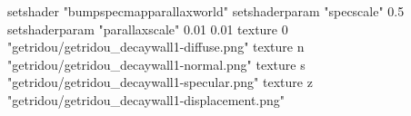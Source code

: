 setshader "bumpspecmapparallaxworld"
setshaderparam "specscale" 0.5
setshaderparam "parallaxscale" 0.01 0.01
texture 0 "getridou/getridou_decaywall1-diffuse.png"
texture n "getridou/getridou_decaywall1-normal.png"
texture s "getridou/getridou_decaywall1-specular.png"
texture z "getridou/getridou_decaywall1-displacement.png"